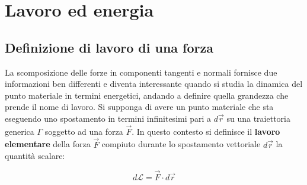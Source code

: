 \chapter{Lavoro ed energia}

\section{Definizione di lavoro di una forza}

La scomposizione delle forze in componenti tangenti e normali fornisce due informazioni ben differenti e diventa interessante quando si studia la dinamica del punto materiale in termini energetici, andando a definire quella grandezza che prende il nome di lavoro.
Si supponga di avere un punto materiale che sta eseguendo uno spostamento in termini infinitesimi pari a $d\vec{r}$ su una traiettoria generica $\Gamma$ soggetto ad una forza $\vec{F}$. In questo contesto si definisce il \textbf{lavoro elementare} della forza $\vec{F}$ compiuto durante lo spostamento vettoriale $d\vec{r}$ la quantità scalare:

\[
	\boxed{d\mathcal{L}=\vec{F}\cdot d\vec{r}}
\]

